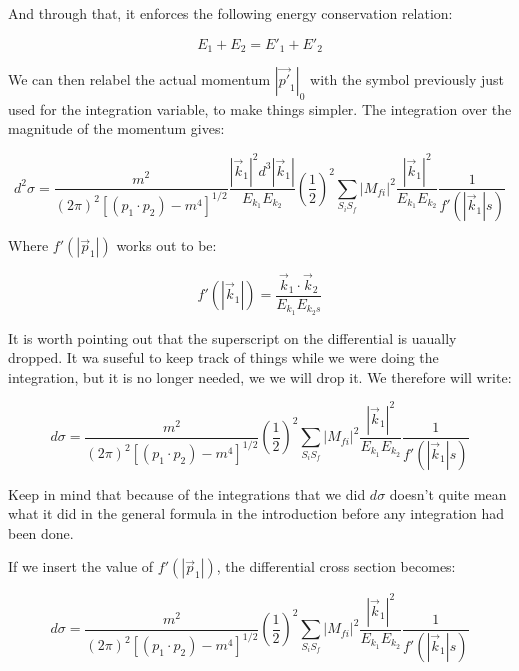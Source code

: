 \documentclass[a4]{article}
\begin{document}
    And through that, it enforces the following energy conservation relation:

    \begin{equation}
        E_1 + E_2 = E'_1 + E'_2
    \end{equation}

    We can then relabel the actual momentum $|\vec{p'}_1|_0$ with the symbol previously just used for the integration variable, to make things simpler. The integration over the magnitude of the momentum gives: 

    \begin{equation}
        d^2 \sigma = \frac{m^2}{(2 \pi)^2 [(p_1 \cdot p_2) - m^4]^{1/2}} \frac{|\vec{k}_1|^2 d^3 |\vec{k}_1|}{E_{k_1} E_{k_2}} (\frac{1}{2})^2 \sum_{S_i S_f} |M_{fi}|^2 \frac{|\vec{k}_1|^2}{E_{k_1} E_{k_2}} \frac{1}{f' (|\vec{k}_1|s)}
    \end{equation}

    Where $f' (|\vec{p}_1|)$ works out to be:

    \begin{equation}
        f' (|\vec{k}_1|) = \frac{\vec{k}_1 \cdot \vec{k}_2}{E_{k_1} E_{k_2s}}
    \end{equation}

    It is worth pointing out that the superscript on the differential is uaually dropped. It wa suseful to keep track of things while we were doing the integration, but it is no longer needed, we we will drop it. 
    We therefore will write: 

    \begin{equation}
        d \sigma = \frac{m^2}{(2 \pi)^2 [(p_1 \cdot p_2) - m^4]^{1/2}} (\frac{1}{2})^2 \sum_{S_i S_f} |M_{fi}|^2 \frac{|\vec{k}_1|^2}{E_{k_1} E_{k_2}} \frac{1}{f' (|\vec{k}_1|s)}
    \end{equation}

    Keep in mind that because of the integrations that we did $d \sigma$ doesn't quite mean what it did in the general formula in the introduction before any  integration had been done.

    If we insert the value of $f' (|\vec{p}_1|)$, the differential cross section becomes:

    \begin{equation}
        d \sigma = \frac{m^2}{(2 \pi)^2 [(p_1 \cdot p_2) - m^4]^{1/2}} (\frac{1}{2})^2 \sum_{S_i S_f} |M_{fi}|^2 \frac{|\vec{k}_1|^2}{E_{k_1} E_{k_2}} \frac{1}{f' (|\vec{k}_1|s)}
    \end{equation}
\end{document}
